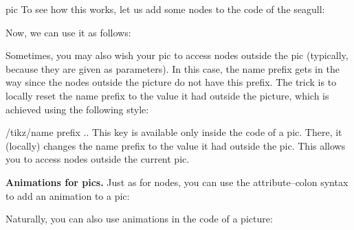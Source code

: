 \begin{pathoperation}{pic}
    To see how this works, let us add some nodes to the code of the seagull:
\begin{codeexample}
\end{codeexample}

    Now, we can use it as follows:
\begin{codeexample}
\end{codeexample}

    Sometimes, you may also wish your pic to access nodes outside the pic
    (typically, because they are given as parameters). In this case, the name
    prefix gets in the way since the nodes outside the picture do not have this
    prefix. The trick is to locally reset the name prefix to the value it had
    outside the picture, which is achieved using the following style:

    \begin{key}{/tikz/name prefix ..}
        This key is available only inside the code of a pic. There, it
        (locally) changes the name prefix to the value it had outside the pic.
        This allows you to access nodes outside the current pic.
    \end{key}

    \medskip
    \textbf{Animations for pics.}
    Just as for nodes, you can use the attribute--colon syntax to add an
    animation to a pic:
\begin{codeexample}[animation list={0.5,1,1.5,2}]
\end{codeexample}
    Naturally, you can also use animations in the code of a picture:
\begin{codeexample}[animation list={0.5,1,1.5,2},width=3cm]
\end{codeexample}
\end{pathoperation}

